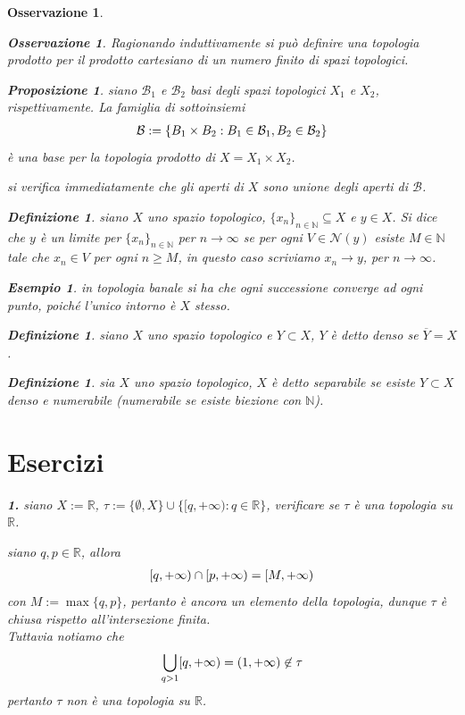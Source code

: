 \documentclass[oneside, 11pt]{amsbook}
\makeatletter
\newcommand{\0}{{(0)}}
\newcommand{\3}{{(3)}}
\theoremstyle{colonplain}
\newtheorem{prop}[thm]{Proposizione}
\theoremstyle{colondefinition}
\newtheorem{defn}[thm]{Definizione}
\newtheorem{ex}[thm]{Esempio}
\theoremstyle{colonremark}
\newtheorem{rmk}[thm]{Osservazione}
\numberwithin{equation}{chapter}
\renewcommand{\proofname}{Dimostrazione}
\renewenvironment{proof}[1][\proofname]{\par
  \pushQED{\end{proof}}%
  \normalfont \topsep6\p@\@plus6\p@\relax
  \trivlist
  \item[\hskip\labelsep\bfseries #1:]\ignorespaces
}{%
  \popQED\endtrivlist\@endpefalse
}
\makeatother
\begin{document}
\begin{rmk}
\begin{rmk}
Ragionando induttivamente si può definire una topologia prodotto per il prodotto cartesiano di un numero finito di spazi topologici.
\end{rmk}
\begin{prop}
siano $\mathcal{B}_1$ e $\mathcal{B}_2$ basi degli spazi topologici $X_1$ e $X_2$, rispettivamente. La famiglia di sottoinsiemi
\begin{align}
    \mathcal{B} := \{ B_1 \times B_2 : B_1 \in \mathcal{B}_1, B_2 \in \mathcal{B}_2 \} \notag
\end{align}
è una base per la topologia prodotto di $X = X_1 \times X_2$.
\end{prop}
\begin{proof}
si verifica immediatamente che gli aperti di $X$ sono unione degli aperti di $\mathcal{B}$.
\end{proof}
\begin{defn}
siano $X$ uno spazio topologico, $\{ x_n \}_{n \in \mathbb{N}} \subseteq X$ e $y \in X$. Si dice che $y$ è un limite per $\{ x_n \}_{n \in \mathbb{N}}$ per $n \rightarrow \infty$ se per ogni $V \in \mathcal{N}(y)$ esiste $M \in \mathbb{N}$ tale che $x_n \in V$ per ogni $n \geq M$, in questo caso scriviamo $x_n \rightarrow y$, per $n \rightarrow \infty$.
\end{defn}
\begin{ex}
in topologia banale si ha che ogni successione converge ad ogni punto, poiché l'unico intorno è $X$ stesso.
\end{ex}
\begin{defn}
siano $X$ uno spazio topologico e $Y \subset X$, $Y$ è detto \textit{denso} se $\overline{Y} = X$.
\end{defn}
\begin{defn}
sia $X$ uno spazio topologico, $X$ è detto \textit{separabile} se esiste $Y \subset X$ denso e numerabile (numerabile se esiste biezione con $\mathbb{N}$).
\end{defn}
\section{Esercizi}
\textbf{1.} siano $X := \mathbb{R}$, $\tau := \{ \emptyset, X \} \cup \{ [q, +\infty) : q \in \mathbb{R} \}$, verificare se $\tau$ è una topologia su $\mathbb{R}$. \\

\begin{proof}[Soluzione]
siano $q, p \in \mathbb{R}$, allora
\begin{align}
    [q, +\infty) \cap [p, +\infty) = [M, +\infty) \notag
\end{align}
con $M := \max \{q, p\}$, pertanto è ancora un elemento della topologia, dunque $\tau$ è chiusa rispetto all'intersezione finita. \\
Tuttavia notiamo che
\begin{align}
    \bigcup_{q > 1} [q, +\infty) = (1, +\infty) \not\in \tau \notag
\end{align}
pertanto $\tau$ non è una topologia su $\mathbb{R}$.
\end{proof}


\end{rmk}
\end{document}
